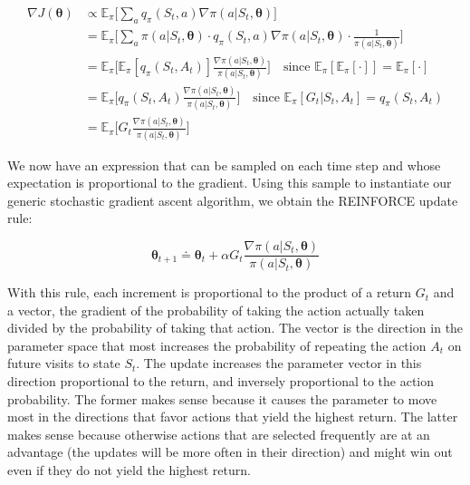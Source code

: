 \begin{equation}
    \begin{split}
        \nabla J(\boldsymbol{\theta}) &\propto \mathbb{E}_\pi \Bigg[ \sum_a q_\pi (S_t, a) \nabla \pi (a \vert S_t, \boldsymbol{\theta}) \Bigg] \\
        &= \mathbb{E}_\pi \Bigg[ \sum_a \pi (a \vert S_t, \boldsymbol{\theta}) \cdot q_\pi (S_t, a) \nabla \pi (a \vert S_t, \boldsymbol{\theta}) \cdot \frac{1}{\pi (a \vert S_t, \boldsymbol{\theta})} \Bigg] \\
        &= \mathbb{E}_\pi \Bigg[ \mathbb{E}_\pi \left[ q_\pi (S_t, A_t) \right] \frac{\nabla \pi (a \vert S_t, \boldsymbol{\theta})}{\pi (a \vert S_t, \boldsymbol{\theta})} \Bigg] \quad \text{since } \mathbb{E}_\pi \left[\mathbb{E}_\pi[\cdot]\right] = \mathbb{E}_\pi [\cdot] \\
        &= \mathbb{E}_\pi \Bigg[ q_\pi (S_t, A_t) \frac{\nabla \pi (a \vert S_t, \boldsymbol{\theta})}{\pi (a \vert S_t, \boldsymbol{\theta})} \Bigg] \quad \text{since } \mathbb{E}_\pi \left[G_t \vert S_t, A_t \right] = q_\pi (S_t, A_t) \\
        &= \mathbb{E}_\pi \Bigg[ G_t \frac{\nabla \pi (a \vert S_t, \boldsymbol{\theta})}{\pi (a \vert S_t, \boldsymbol{\theta})} \Bigg]
    \end{split}
    \label{eq:ch8-stateandactionsampledpolicygradient}
\end{equation}

We now have an expression that can be sampled on each time step and whose expectation is proportional to the gradient. Using this sample to instantiate our generic stochastic gradient ascent algorithm, we obtain the REINFORCE update rule:

\begin{equation}
    \boldsymbol{\theta}_{t+1} \doteq \boldsymbol{\theta}_{t} + \alpha G_t \frac{\nabla \pi (a \vert S_t, \boldsymbol{\theta})}{\pi (a \vert S_t, \boldsymbol{\theta})}
    \label{eq:ch8-reinforceupdaterule}
\end{equation}

With this rule, each increment is proportional to the product of a return $G_t$ and a vector, the gradient of the probability of taking the action actually taken divided by the probability of taking that action. The vector is the direction in the parameter space that most increases the probability of repeating the action $A_t$ on future visits to state $S_t$. The update increases the parameter vector in this direction proportional to the return, and inversely proportional to the action probability. The former makes sense because it causes the parameter to move most in the directions that favor actions that yield the highest return. The latter makes sense because otherwise actions that are selected frequently are at an advantage (the updates will be more often in their direction) and might win out even if they do not yield the highest return.


